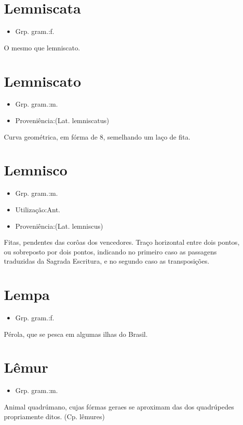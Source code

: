 \section{Lemniscata}
\begin{itemize}
\item {Grp. gram.:f.}
\end{itemize}
O mesmo que \textunderscore lemniscato\textunderscore .
\section{Lemniscato}
\begin{itemize}
\item {Grp. gram.:m.}
\end{itemize}
\begin{itemize}
\item {Proveniência:(Lat. \textunderscore lemniscatus\textunderscore )}
\end{itemize}
Curva geométrica, em fórma de 8, semelhando um laço de fita.
\section{Lemnisco}
\begin{itemize}
\item {Grp. gram.:m.}
\end{itemize}
\begin{itemize}
\item {Utilização:Ant.}
\end{itemize}
\begin{itemize}
\item {Proveniência:(Lat. \textunderscore lemniscus\textunderscore )}
\end{itemize}
Fitas, pendentes das corôas dos vencedores.
Traço horizontal entre dois pontos, ou sobreposto por dois pontos, indicando no primeiro caso as passagens traduzidas da Sagrada Escritura, e no segundo caso as transposições.
\section{Lempa}
\begin{itemize}
\item {Grp. gram.:f.}
\end{itemize}
Pérola, que se pesca em algumas ilhas do Brasil.
\section{Lêmur}
\begin{itemize}
\item {Grp. gram.:m.}
\end{itemize}
Animal quadrúmano, cujas fórmas geraes se aproximam das dos quadrúpedes propriamente ditos.
(Cp. \textunderscore lêmures\textunderscore )
